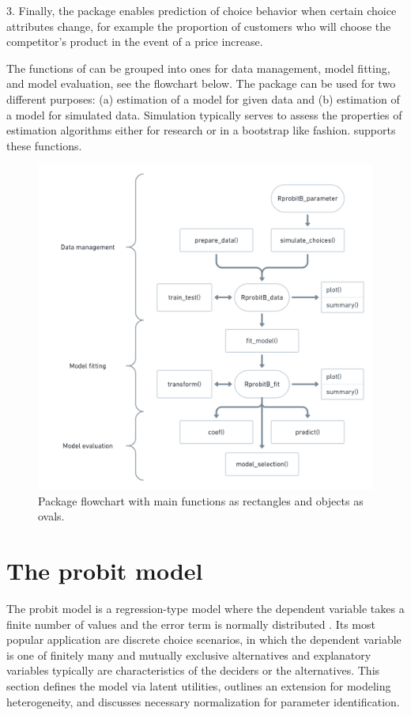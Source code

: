 \documentclass[article]{jss}
\begin{document}
3. Finally, the package enables prediction of choice behavior when certain choice attributes change, for example the proportion of customers who will choose the competitor's product in the event of a price increase.

The functions of  can be grouped into ones for data management, model fitting, and model evaluation, see the flowchart below. The package can be used for two different purposes: (a) estimation of a model for given data and (b) estimation of a model for simulated data. Simulation typically serves to assess the properties of estimation algorithms either for research or in a bootstrap like fashion.  supports these functions.

\begin{figure}[t!]
  \includegraphics{flowchart.png}
  \caption{Package flowchart with main functions as rectangles and objects as ovals.}
  \label{fig:flowchart}
\end{figure}


\section{The probit model} \label{sec:probit_model}

The probit model is a regression-type model where the dependent variable takes a finite number of values and the error term is normally distributed \citep{Agresti:2015}. Its most popular application are discrete choice scenarios, in which the dependent variable is one of finitely many and mutually exclusive alternatives  and explanatory variables typically are characteristics of the deciders or the alternatives. This section defines the model via latent utilities, outlines an extension for modeling heterogeneity, and discusses necessary normalization for parameter identification.
\end{document}
